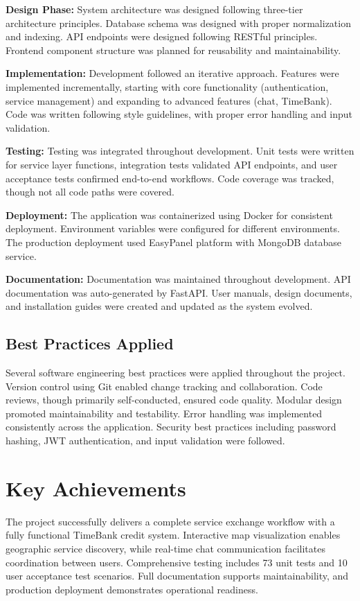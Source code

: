 \documentclass[12pt,a4paper]{report}
\begin{document}
\textbf{Design Phase:} System architecture was designed following three-tier architecture principles. Database schema was designed with proper normalization and indexing. API endpoints were designed following RESTful principles. Frontend component structure was planned for reusability and maintainability.

\textbf{Implementation:} Development followed an iterative approach. Features were implemented incrementally, starting with core functionality (authentication, service management) and expanding to advanced features (chat, TimeBank). Code was written following style guidelines, with proper error handling and input validation.

\textbf{Testing:} Testing was integrated throughout development. Unit tests were written for service layer functions, integration tests validated API endpoints, and user acceptance tests confirmed end-to-end workflows. Code coverage was tracked, though not all code paths were covered.

\textbf{Deployment:} The application was containerized using Docker for consistent deployment. Environment variables were configured for different environments. The production deployment used EasyPanel platform with MongoDB database service.

\textbf{Documentation:} Documentation was maintained throughout development. API documentation was auto-generated by FastAPI. User manuals, design documents, and installation guides were created and updated as the system evolved.

\subsection{Best Practices Applied}

Several software engineering best practices were applied throughout the project. Version control using Git enabled change tracking and collaboration. Code reviews, though primarily self-conducted, ensured code quality. Modular design promoted maintainability and testability. Error handling was implemented consistently across the application. Security best practices including password hashing, JWT authentication, and input validation were followed.

\section{Key Achievements}

The project successfully delivers a complete service exchange workflow with a fully functional TimeBank credit system. Interactive map visualization enables geographic service discovery, while real-time chat communication facilitates coordination between users. Comprehensive testing includes 73 unit tests and 10 user acceptance test scenarios. Full documentation supports maintainability, and production deployment demonstrates operational readiness.
\end{document}
